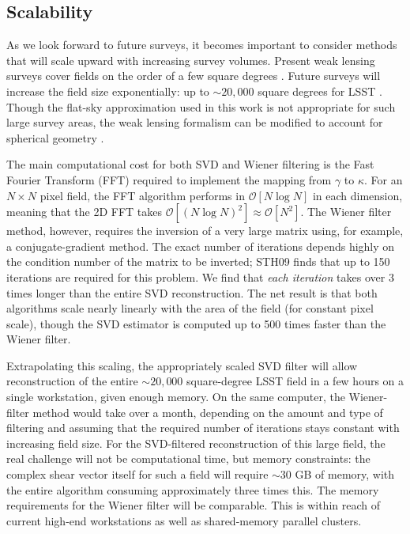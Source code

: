\documentclass[twocolumn]{emulateapj}
\begin{document}
\subsection{Scalability}
\label{Scalability} 

As we look forward to future surveys, it becomes important to consider methods 
that will scale upward with increasing survey volumes. Present weak lensing
surveys cover fields on the order of a few square degrees 
\citep[e.g.\ COSMOS,][]{Massey07}.  Future surveys will increase the field
size exponentially: up to $\sim\!\!20,000$ square degrees for LSST
\citep{LSST09}.  Though the flat-sky approximation used in this 
work is not appropriate for such large survey
areas, the weak lensing formalism can be modified to 
account for spherical geometry \citep[see, e.g.][]{Heavens03}. 

The main computational cost for both SVD and Wiener filtering is the
Fast Fourier Transform (FFT) required to implement the mapping from
$\gamma$ to $\kappa$.  For an $N \times N$ pixel field, the FFT algorithm 
performs in $\mathcal{O}[N\log N]$ in each dimension, 
meaning that the 2D FFT takes 
$\mathcal{O}[(N\log N)^2] \approx \mathcal{O}[N^2]$.  The Wiener
filter method, however, requires the inversion of a very large matrix 
using, for example, a conjugate-gradient method.  
The exact number of iterations
depends highly on the condition number of the matrix to be inverted;
STH09 finds that up to 150 iterations are required for this problem.
We find that \textit{each iteration} takes over 3 times longer than the 
entire SVD reconstruction. The net result is that both algorithms
scale nearly linearly with the area of the field (for constant pixel scale),
though the SVD estimator is computed up to 500 times faster 
than the Wiener filter. 

Extrapolating this scaling, the appropriately scaled 
SVD filter will allow reconstruction
of the entire $\sim\!\!20,000$ square-degree 
LSST field in a few hours on a single workstation, given
enough memory.  On the same computer, the Wiener-filter method would take 
over a month, depending on the amount and type of filtering and 
assuming that the required number of iterations stays constant with 
increasing field size. For the SVD-filtered reconstruction of this 
large field, the real challenge will not be computational time, 
but memory constraints: the complex shear
vector itself for such a field will require $\sim\!\!30$ GB of memory,
with the entire algorithm consuming approximately three times this.
The memory requirements for the Wiener filter will be comparable.
This is within reach of current high-end workstations as well as 
shared-memory parallel clusters.
\end{document}
